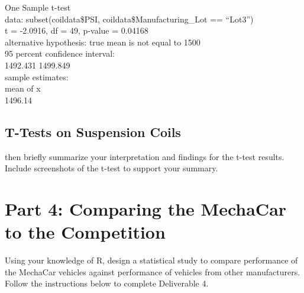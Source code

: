 \documentclass[11pt]{article}
\begin{document}
\begin{org}


One Sample t-test\\

data:  subset(coildata\$PSI, coildata\$Manufacturing\_Lot == ``Lot3'')\\
t = -2.0916, df = 49, p-value = 0.04168\\
alternative hypothesis: true mean is not equal to 1500\\
95 percent confidence interval:\\
 1492.431 1499.849\\
sample estimates:\\
mean of x\\
  1496.14\\
\end{org}


\subsection{T-Tests on Suspension Coils}
\label{sec:orgb6caa46}

then briefly summarize your interpretation and findings for the t-test results. Include screenshots of the t-test to support your summary.\\

\section{Part 4: Comparing the MechaCar to the Competition}
\label{sec:org1f009c3}

Using your knowledge of R, design a statistical study to compare performance of the MechaCar vehicles against performance of vehicles from other manufacturers.\\

Follow the instructions below to complete Deliverable 4.\\
\end{document}
